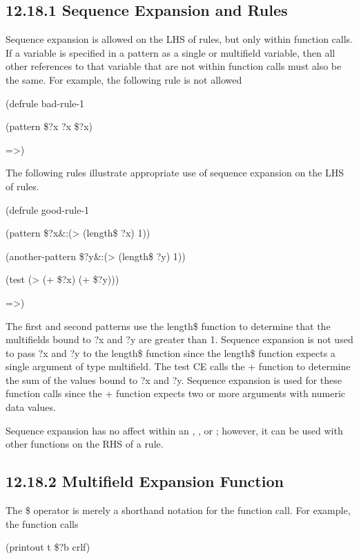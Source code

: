 \documentclass[letterpaper,10pt,english]{sphinxmanual}
\begin{document}
\subsection{12.18.1 Sequence Expansion and Rules}
\label{\detokenize{actions:sequence-expansion-and-rules}}
Sequence expansion is allowed on the LHS of rules, but only within
function calls. If a variable is specified in a pattern as a single or
multifield variable, then all other references to that variable that are
not within function calls must also be the same. For example, the
following rule is not allowed

(defrule bad-rule-1

(pattern \$?x ?x \$?x)

=\textgreater{})

The following rules illustrate appropriate use of sequence expansion on
the LHS of rules.

(defrule good-rule-1

(pattern \$?x\&:(\textgreater{} (length\$ ?x) 1))

(another-pattern \$?y\&:(\textgreater{} (length\$ ?y) 1))

(test (\textgreater{} (+ \$?x) (+ \$?y)))

=\textgreater{})

The first and second patterns use the length\$ function to determine that
the multifields bound to ?x and ?y are greater than 1. Sequence
expansion is not used to pass ?x and ?y to the length\$ function since
the length\$ function expects a single argument of type multifield. The
test CE calls the + function to determine the sum of the values bound to
?x and ?y. Sequence expansion is used for these function calls since the
+ function expects two or more arguments with numeric data values.

Sequence expansion has no affect within an , , or
; however, it can be used with other functions on the RHS
of a rule.


\subsection{12.18.2 Multifield Expansion Function}
\label{\detokenize{actions:multifield-expansion-function}}
The \$ operator is merely a shorthand notation for the 
function call. For example, the function calls

(printout t \$?b crlf)
\end{document}
